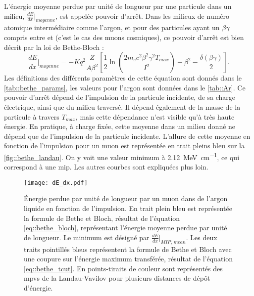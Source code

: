         L'énergie moyenne perdue par unité de longueur par une particule dans un milieu, $\frac{dE}{dx}\rvert_{moyenne}$, est appelée pouvoir d'arrêt. Dans les milieux de numéro atomique intermédiaire comme l'argon, et pour des particules ayant un $\beta\gamma$ compris entre  et  (c'est le cas des muons cosmiques), ce pouvoir d'arrêt est bien décrit par la loi de Bethe-Bloch\cite{pdg2018} :
        \begin{equation}\label{eq::bethe_bloch}
          \frac{dE}{dx}\biggr\rvert_{moyenne} = -Kq^2 \frac{Z}{A\beta^2}\left[\frac{1}{2}\ln\left(\frac{2m_ec^2\beta^2\gamma^2T_{max}}{I^2}\right)-\beta^2-\frac{\delta(\beta\gamma)}{2} \right].
        \end{equation}
        Les définitions des différents paramètres de cette équation sont donnés dans le \autoref{tab::bethe_params}, les valeurs pour l'argon sont données dans le \autoref{tab::Ar}. Ce pouvoir d'arrêt dépend de l'impulsion de la particule incidente, de sa charge électrique, ainsi que du milieu traversé. Il dépend également de la masse de la particule à travers $T_{max}$, mais cette dépendance n'est visible qu'à très haute énergie\cite{pdg2018}. En pratique, à charge fixée, cette moyenne dans un milieu donné ne dépend que de l'impulsion de la particule incidente. L'allure de cette moyenne en fonction de l'impulsion pour un muon est représentée en trait pleins bleu sur la \autoref{fig::bethe_landau}. On y voit une valeur minimum à \SI{2.12}{\mega\electronvolt\per\centi\meter}, ce qui correspond à une \gls{mip}. Les autres courbes sont expliquées plus loin.

        \begin{figure}[!htb]
          \centering
          \texttt{[image: dE\_dx.pdf]}
          \caption[Énergie perdue par unité de longueur d'une MIP en fonction de l'impulsion]{\label{fig::bethe_landau}Énergie perdue par unité de longueur par un muon dans de l'argon liquide en fonction de l'impulsion. En trait plein bleu est représentée la formule de Bethe et Bloch, résultat de l'équation \eqref{eq::bethe_bloch}, représentant l'énergie moyenne perdue par unité de longueur. Le minimum est désigné par $\frac{dE}{dx}\rvert_{MIP,\,mean}$. Les deux traits pointillés bleus représentent la formule de Bethe et Bloch avec une coupure sur l'énergie maximum transférée, résultat de l'équation \eqref{eq::bethe_tcut}. En points-tiraits de couleur sont représentés des \glspl{mpv} de la Landau-Vavilov pour plusieurs distances de dépôt d'énergie.}
        \end{figure}

